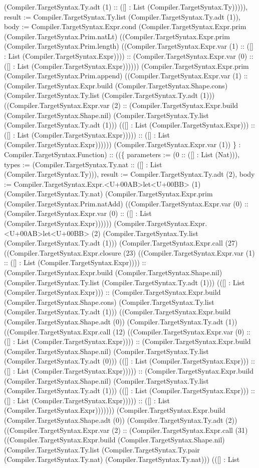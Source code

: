 \documentclass[11pt]{article}
\begin{document}
(Compiler.TargetSyntax.Ty.adt (1) :: ([] : List (Compiler.TargetSyntax.Ty))))), result := Compiler.TargetSyntax.Ty.list (Compiler.TargetSyntax.Ty.adt (1)), body := Compiler.TargetSyntax.Expr.cond (Compiler.TargetSyntax.Expr.prim (Compiler.TargetSyntax.Prim.natLt) ((Compiler.TargetSyntax.Expr.prim (Compiler.TargetSyntax.Prim.length) ((Compiler.TargetSyntax.Expr.var (1) :: ([] : List (Compiler.TargetSyntax.Expr)))) :: (Compiler.TargetSyntax.Expr.var (0) :: ([] : List (Compiler.TargetSyntax.Expr)))))) (Compiler.TargetSyntax.Expr.prim (Compiler.TargetSyntax.Prim.append) ((Compiler.TargetSyntax.Expr.var (1) :: (Compiler.TargetSyntax.Expr.build (Compiler.TargetSyntax.Shape.cons) (Compiler.TargetSyntax.Ty.list (Compiler.TargetSyntax.Ty.adt (1))) ((Compiler.TargetSyntax.Expr.var (2) :: (Compiler.TargetSyntax.Expr.build (Compiler.TargetSyntax.Shape.nil) (Compiler.TargetSyntax.Ty.list (Compiler.TargetSyntax.Ty.adt (1))) (([] : List (Compiler.TargetSyntax.Expr))) :: ([] : List (Compiler.TargetSyntax.Expr))))) :: ([] : List (Compiler.TargetSyntax.Expr)))))) (Compiler.TargetSyntax.Expr.var (1)) \} : Compiler.TargetSyntax.Function) :: ((\{ parameters := (0 :: ([] : List (Nat))), types := (Compiler.TargetSyntax.Ty.nat :: ([] : List (Compiler.TargetSyntax.Ty))), result := Compiler.TargetSyntax.Ty.adt (2), body := Compiler.TargetSyntax.Expr.<U+00AB>let<U+00BB> (1) (Compiler.TargetSyntax.Ty.nat) (Compiler.TargetSyntax.Expr.prim (Compiler.TargetSyntax.Prim.natAdd) ((Compiler.TargetSyntax.Expr.var (0) :: (Compiler.TargetSyntax.Expr.var (0) :: ([] : List (Compiler.TargetSyntax.Expr)))))) (Compiler.TargetSyntax.Expr.<U+00AB>let<U+00BB> (2) (Compiler.TargetSyntax.Ty.list (Compiler.TargetSyntax.Ty.adt (1))) (Compiler.TargetSyntax.Expr.call (27) ((Compiler.TargetSyntax.Expr.closure (23) ((Compiler.TargetSyntax.Expr.var (1) :: ([] : List (Compiler.TargetSyntax.Expr)))) :: (Compiler.TargetSyntax.Expr.build (Compiler.TargetSyntax.Shape.nil) (Compiler.TargetSyntax.Ty.list (Compiler.TargetSyntax.Ty.adt (1))) (([] : List (Compiler.TargetSyntax.Expr))) :: (Compiler.TargetSyntax.Expr.build (Compiler.TargetSyntax.Shape.cons) (Compiler.TargetSyntax.Ty.list (Compiler.TargetSyntax.Ty.adt (1))) ((Compiler.TargetSyntax.Expr.build (Compiler.TargetSyntax.Shape.adt (0)) (Compiler.TargetSyntax.Ty.adt (1)) ((Compiler.TargetSyntax.Expr.call (12) ((Compiler.TargetSyntax.Expr.var (0) :: ([] : List (Compiler.TargetSyntax.Expr)))) :: (Compiler.TargetSyntax.Expr.build (Compiler.TargetSyntax.Shape.nil) (Compiler.TargetSyntax.Ty.list (Compiler.TargetSyntax.Ty.adt (0))) (([] : List (Compiler.TargetSyntax.Expr))) :: ([] : List (Compiler.TargetSyntax.Expr))))) :: (Compiler.TargetSyntax.Expr.build (Compiler.TargetSyntax.Shape.nil) (Compiler.TargetSyntax.Ty.list (Compiler.TargetSyntax.Ty.adt (1))) (([] : List (Compiler.TargetSyntax.Expr))) :: ([] : List (Compiler.TargetSyntax.Expr))))) :: ([] : List (Compiler.TargetSyntax.Expr))))))) (Compiler.TargetSyntax.Expr.build (Compiler.TargetSyntax.Shape.adt (0)) (Compiler.TargetSyntax.Ty.adt (2)) ((Compiler.TargetSyntax.Expr.var (2) :: (Compiler.TargetSyntax.Expr.call (31) ((Compiler.TargetSyntax.Expr.build (Compiler.TargetSyntax.Shape.nil) (Compiler.TargetSyntax.Ty.list (Compiler.TargetSyntax.Ty.pair (Compiler.TargetSyntax.Ty.nat) (Compiler.TargetSyntax.Ty.nat))) (([] : List 
\end{document}
